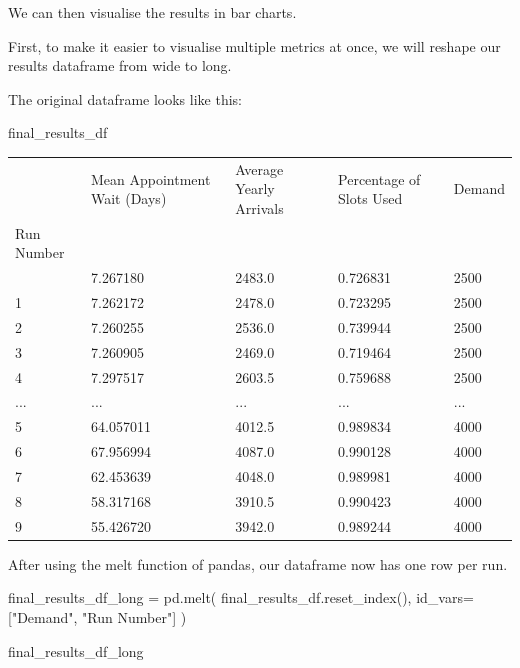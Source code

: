 \documentclass[
  letterpaper,
  DIV=11,
  numbers=noendperiod]{scrreprt}
\newenvironment{Shaded}{}{}
\newcommand{\NormalTok}[1]{\textcolor[rgb]{0.14,0.16,0.18}{#1}}
\newcommand{\OperatorTok}[1]{\textcolor[rgb]{0.14,0.16,0.18}{#1}}
\newcommand{\StringTok}[1]{\textcolor[rgb]{0.01,0.18,0.38}{#1}}
\begin{document}
We can then visualise the results in bar charts.

First, to make it easier to visualise multiple metrics at once, we will
reshape our results dataframe from wide to long.

The original dataframe looks like this:

\begin{Shaded}
\begin{Highlighting}[]
\NormalTok{final\_results\_df}
\end{Highlighting}
\end{Shaded}

\begin{longtable}[]{@{}lllll@{}}
\toprule\noalign{}
& Mean Appointment Wait (Days) & Average Yearly Arrivals & Percentage of
Slots Used & Demand \\
Run Number & & & & \\
\midrule\noalign{}
\endhead
\bottomrule\noalign{}
\endlastfoot
0 & 7.267180 & 2483.0 & 0.726831 & 2500 \\
1 & 7.262172 & 2478.0 & 0.723295 & 2500 \\
2 & 7.260255 & 2536.0 & 0.739944 & 2500 \\
3 & 7.260905 & 2469.0 & 0.719464 & 2500 \\
4 & 7.297517 & 2603.5 & 0.759688 & 2500 \\
... & ... & ... & ... & ... \\
5 & 64.057011 & 4012.5 & 0.989834 & 4000 \\
6 & 67.956994 & 4087.0 & 0.990128 & 4000 \\
7 & 62.453639 & 4048.0 & 0.989981 & 4000 \\
8 & 58.317168 & 3910.5 & 0.990423 & 4000 \\
9 & 55.426720 & 3942.0 & 0.989244 & 4000 \\
\end{longtable}

After using the melt function of pandas, our dataframe now has one row
per run.

\begin{Shaded}
\begin{Highlighting}[]
\NormalTok{final\_results\_df\_long }\OperatorTok{=}\NormalTok{ pd.melt(}
\NormalTok{  final\_results\_df.reset\_index(),}
\NormalTok{  id\_vars}\OperatorTok{=}\NormalTok{[}\StringTok{"Demand"}\NormalTok{, }\StringTok{"Run Number"}\NormalTok{]}
\NormalTok{  )}

\NormalTok{final\_results\_df\_long}
\end{Highlighting}
\end{Shaded}
\end{document}

